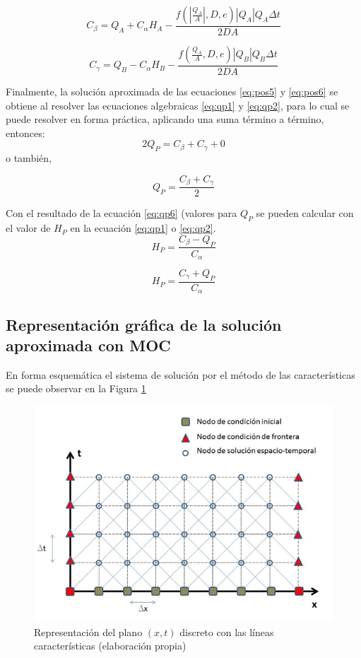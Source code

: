 \documentclass[letterpaper]{report}
\begin{document}
\begin{equation}
	C_\beta=Q_A+C_\alpha H_A-\dfrac{f(|\frac{Q_A}{A}|,D,e)|Q_A|Q_A \Delta t}{2DA}
\label{eq:qp4}
\end{equation}

\begin{equation}
	C_\gamma=Q_B-C_\alpha H_B-\dfrac{f(\frac{Q_A}{A},D,e)|Q_B|Q_B \Delta t}{2DA}
\label{eq:qp5}
\end{equation}

Finalmente, la solución aproximada de las ecuaciones \ref{eq:pos5} y \ref{eq:pos6} se obtiene al resolver las ecuaciones algebraicas \ref{eq:qp1} y \ref{eq:qp2}, para lo cual se puede resolver en forma práctica, aplicando una suma término a término, entonces:
\begin{equation}
	{2Q}_P=C_\beta+C_\gamma+0
\end{equation}
o también,

\begin{equation}
	Q_P=\frac{C_\beta+C_\gamma}{2}
\label{eq:qp6}
\end{equation}

Con el resultado de la ecuación \ref{eq:qp6} (valores para $Q_P$ se pueden calcular con el valor de $H_P$ en la ecuación \ref{eq:qp1} o \ref{eq:qp2}.
\begin{equation}
	H_P=\frac{C_\beta-Q_P}{C_\alpha}
\end{equation}

\begin{equation}
	H_P=\frac{C_\gamma+Q_P}{C_\alpha}
\end{equation}

\subsection{Representación gráfica de la solución aproximada con MOC}
En forma esquemática el sistema de solución por el método de las características se puede observar en la Figura \ref{fig:fig23}
\begin{figure}[H]
	\centering
	\includegraphics[width=0.7\linewidth]{fig23}
	\caption{Representación del plano $(x,t)$ discreto con las líneas características (elaboración propia)}
	\label{fig:fig23}
\end{figure}
\end{document}
